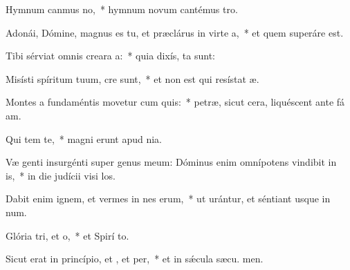 \item Hymnum canmus no,~* hymnum novum cantémus  tro.
\item Adonái, Dómine, magnus es tu, et præclárus in virte a,~* et quem superáre  est.
\item Tibi sérviat omnis creara a:~* quia dixís,  ta sunt:
\item Misísti spíritum tuum,  cre sunt,~* et non est qui resístat  æ.
\item Montes a fundaméntis movetur cum quis:~* petræ, sicut cera, liquéscent ante fá am.
\item Qui tem  te,~* magni erunt apud   nia.
\item Væ genti insurgénti super genus meum: Dóminus enim omnípotens vindibit in is,~* in die judícii visi los.
\item Dabit enim ignem, et vermes in nes erum,~* ut urántur, et séntiant usque in num.
\item Glória tri, et o,~* et Spirí to.
\item Sicut erat in princípio, et , et per,~* et in sǽcula sæcu. men.
